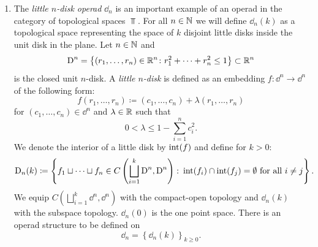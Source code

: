\begin{egs}
\begin{enumerate}
            \item The {\em little $n$-disk operad} $\dd_n$ is an important
            example of an operad in the category of topological spaces $\Top$.
            For all $n \in \mathbb{N}$ we will define $\dd_n(k)$ as a topological space
            representing the space of $k$ disjoint little disks inside the unit
            disk in the plane. Let $n \in \mathbb{N}$ and 
            \[
                \operatorname{D}^n = \left\{ (r_1, \dots, r_n) \in \mathbb{R}^n \colon r_1^2 + \dots + r_n^2 \leq 1\right\} \subset \mathbb{R}^n
            \]
            is the closed unit $n$-disk. A \emph{little $n$-disk} is defined as
            an embedding $f \colon \dd^n \to \dd^n$ of the following form:
            \[
             f(r_1, \dots, r_n) \coloneqq (c_1, \dots, c_n) 
            + \lambda(r_1, \dots, r_n)
            \]
            for $(c_1, \dots, c_n) \in \dd^n$ and $\lambda \in \mathbb{R}$ such that
            \[
                0 < \lambda \leq 1 - \sum_{i=1}^{n} c_i^2.     
            \]
            We denote the interior of a little disk by $\operatorname{int}(f)$ and define
            for $k > 0$:
            \[
                \operatorname{D}_n(k) \coloneqq \left\{ f_1 \sqcup \dots \sqcup f_n \in C\left(\bigsqcup_{i=1}^k \operatorname{D}^n, \operatorname{D}^n\right) \colon \operatorname{int}(f_i) \cap \operatorname{int}(f_j) = \emptyset \text{ for all } i \not= j\right\}.
            \]
            We equip $C\left(\bigsqcup_{i=1}^k \dd^n, \dd^n\right)$ with the
            compact-open topology and $\dd_n(k)$ with the subspace topology.
            $\dd_n(0)$ is the one point space.
            There is an operad structure to be defined on
            \[
                \dd_n = \left\{\dd_n(k)\right\}_{k \geq 0}.
            \]
                        

\end{enumerate}
\end{egs}
